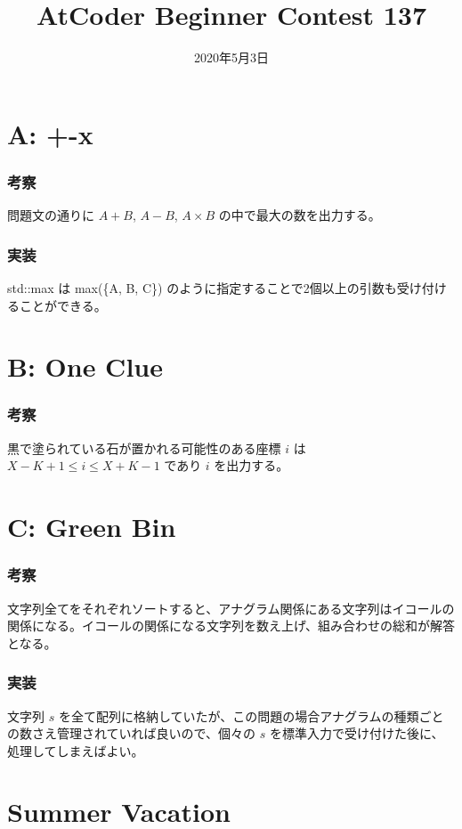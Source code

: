 \documentclass{jarticle}
\title{AtCoder Beginner Contest 137}
\date{2020年5月3日}
\begin{document}
\maketitle

\section*{A: +-x}
\subsubsection*{考察}
問題文の通りに $A + B$, $A - B$, $A \times B$ の中で最大の数を出力する。

\subsubsection*{実装}
std::max は max(\{A, B, C\}) のように指定することで2個以上の引数も受け付けることができる。


\section*{B: One Clue}
\subsubsection*{考察}
黒で塗られている石が置かれる可能性のある座標 $i$ は $X - K + 1 \leq i \leq X + K - 1 $ であり $i$ を出力する。


\section*{C: Green Bin}
\subsubsection*{考察}
文字列全てをそれぞれソートすると、アナグラム関係にある文字列はイコールの関係になる。イコールの関係になる文字列を数え上げ、組み合わせの総和が解答となる。

\subsubsection*{実装}
文字列 $s$ を全て配列に格納していたが、この問題の場合アナグラムの種類ごとの数さえ管理されていれば良いので、個々の $s$ を標準入力で受け付けた後に、処理してしまえばよい。


\section*{Summer Vacation}
\end{document}
